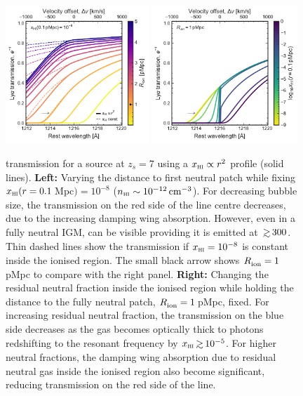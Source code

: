 \documentclass[fleqn,usenatbib]{mnras}
\begin{document}
\begin{figure}
    \includegraphics[width=0.48\textwidth]{figs/fig1a.pdf}
    \includegraphics[width=0.49\textwidth]{figs/fig1b.pdf}
    \caption{\lya transmission for a source at $z_s=7$ using a $\xHI \propto r^{2}$ profile (solid lines). \textbf{Left:} Varying the distance to first neutral patch while fixing $\xHI(r=0.1\,$Mpc$) = 10^{-8}$ ($n_\HI \sim 10^{-12}\cm^{-3}$). For decreasing bubble size, the transmission on the red side of the \lya line centre decreases, due to the increasing damping wing absorption. However, even in a fully neutral IGM, \lya can be visible providing it is emitted at $\simgt300$\kms. Thin dashed lines show the transmission if $\xHI=10^{-8}$ is constant inside the ionised region. The small black arrow shows $\Rion=1\,$pMpc to compare with the right panel. \textbf{Right:} Changing the residual neutral fraction inside the ionised region while holding the distance to the fully neutral patch, $\Rion=1\,$pMpc, fixed. For increasing residual neutral fraction, the transmission on the blue side decreases as the gas becomes optically thick to \lya photons redshifting to the resonant frequency by $\xHI \simgt 10^{-5}$. For higher neutral fractions, the damping wing absorption due to residual neutral gas inside the ionised region also become significant, reducing transmission on the red side of the line.}
    \label{fig:lya_transmission}
\end{figure}
\end{document}
